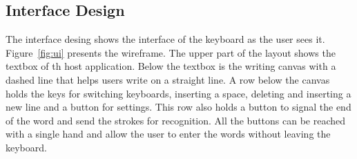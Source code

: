 \documentclass[12pt,a4paper]{report}
\begin{document}
\subsection{Interface Design}
The interface desing shows the interface of the keyboard as the user sees it. Figure~\ref{fig:ui} presents the wireframe. The upper part of the layout shows the textbox of th host application. Below the textbox is the writing canvas with a dashed line that helps users write on a straight line. A row below the canvas holds the keys for switching keyboards, inserting a space, deleting and inserting a new line and a button for settings. This row also holds a button to signal the end of the word and send the strokes for recognition. All the buttons can be reached with a single hand and allow the user to enter the words without leaving the keyboard.

\end{document}
